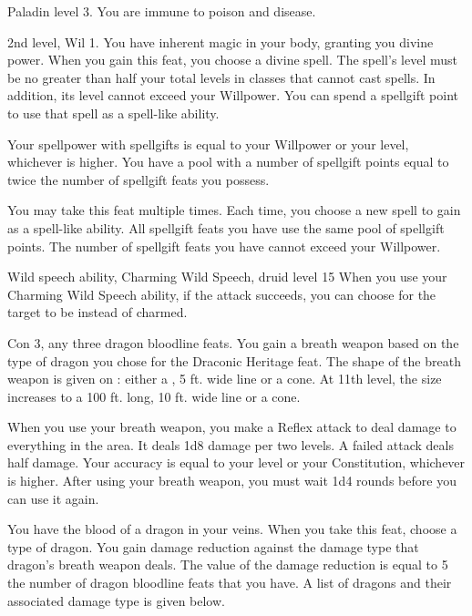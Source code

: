 \featpre Paladin level 3.
\featben You are immune to poison and disease.

\featpres 2nd level, Wil 1.
\featben You have inherent magic in your body, granting you divine power.
When you gain this feat, you choose a divine spell.
The spell's level must be no greater than half your total levels in classes that cannot cast spells.
In addition, its level cannot exceed your Willpower.
You can spend a spellgift point to use that spell as a spell-like ability.

Your spellpower with spellgifts is equal to your Willpower or your level, whichever is higher.
You have a pool with a number of spellgift points equal to twice the number of spellgift feats you possess.

You may take this feat multiple times.
Each time, you choose a new spell to gain as a spell-like ability.
All spellgift feats you have use the same pool of spellgift points.
The number of spellgift feats you have cannot exceed your Willpower.

\featpre Wild speech ability, Charming Wild Speech, druid level 15
\featben When you use your Charming Wild Speech ability, if the attack succeeds, you can choose for the target to be \dominated instead of charmed.

\featpres Con 3, any three dragon bloodline feats.
\featben You gain a breath weapon based on the type of dragon you chose for the Draconic Heritage feat.
The shape of the breath weapon is given on : either a \arealarge, 5 ft. wide line or a \areamed cone.
At 11th level, the size increases to a 100 ft. long, 10 ft. wide line or a \arealarge cone.

When you use your breath weapon, you make a Reflex attack to deal damage to everything in the area.
It deals 1d8 damage per two levels.
A failed attack deals half damage.
Your accuracy is equal to your level or your Constitution, whichever is higher.
After using your breath weapon, you must wait 1d4 rounds before you can use it again.

\featben You have the blood of a dragon in your veins.
When you take this feat, choose a type of dragon.
You gain damage reduction against the damage type that dragon's breath weapon deals.
The value of the damage reduction is equal to 5 \mtimes the number of dragon bloodline feats that you have.
A list of dragons and their associated damage type is given below.

